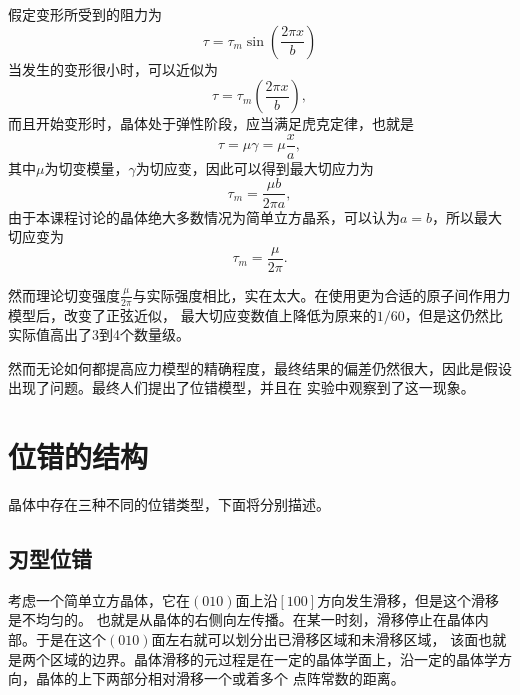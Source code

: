             假定变形所受到的阻力为
            \begin{equation}
                \tau=\tau_m\sin{\left( \frac{2\pi x}{b} \right)}
            \end{equation}
            当发生的变形很小时，可以近似为
            \begin{equation}
                \tau=\tau_m{\left( \frac{2\pi x}{b} \right)},
            \end{equation}
            而且开始变形时，晶体处于弹性阶段，应当满足虎克定律，也就是
            \begin{equation}
                \tau=\mu\gamma=\mu\frac{x}{a},
            \end{equation}
            其中$\mu$为切变模量，$\gamma$为切应变，因此可以得到最大切应力为
            \begin{equation}
                \tau_m=\frac{\mu b}{2\pi a},
            \end{equation}
            由于本课程讨论的晶体绝大多数情况为简单立方晶系，可以认为$a=b$，所以最大切应变为
            \begin{equation}
                \tau_m=\frac{\mu}{2\pi}.
            \end{equation}

            然而理论切变强度$\frac{\mu}{2\pi}$与实际强度相比，实在太大。在使用更为合适的原子间作用力模型后，改变了正弦近似，
            最大切应变数值上降低为原来的$1/60$，但是这仍然比实际值高出了3到4个数量级。

            然而无论如何都提高应力模型的精确程度，最终结果的偏差仍然很大，因此是假设出现了问题。最终人们提出了位错模型，并且在
            实验中观察到了这一现象。
        
        \section{位错的结构}
            晶体中存在三种不同的位错类型，下面将分别描述。
            \subsection{刃型位错}
                考虑一个简单立方晶体，它在$(010)$面上沿$[100]$方向发生滑移，但是这个滑移是不均匀的。
                也就是从晶体的右侧向左传播。在某一时刻，滑移停止在晶体内部。于是在这个$(010)$面左右就可以划分出已滑移区域和未滑移区域，
                该面也就是两个区域的边界。晶体滑移的元过程是在一定的晶体学面上，沿一定的晶体学方向，晶体的上下两部分相对滑移一个或着多个
                点阵常数的距离。

